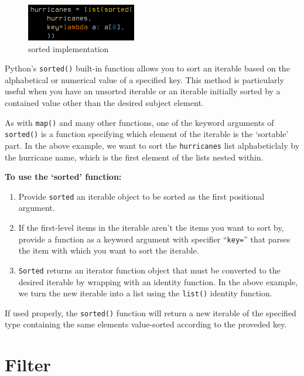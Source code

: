 \documentclass[12pt]{article}
\begin{document}
\begin{figure}
	\begin{center}
		\includegraphics[width=.38\textwidth]{./figures/4_sorted/codeblock_sorted.png}
		\caption{sorted implementation}
		\label{sorted code} %
	\end{center}
\end{figure}

Python's \texttt{sorted()} built-in function allows you to sort an iterable based on the alphabetical or numerical value of a specified key. This method is particularly useful when you have an unsorted iterable or an iterable initially sorted by a contained value other than the desired subject element.

As with \texttt{map()} and many other functions, one of the keyword arguments of \texttt{sorted()} is a function specifying which element of the iterable is the `sortable' part. In the above example, we want to sort the \texttt{hurricanes} list alphabeticlaly by the hurricane name, which is the first element of the lists nested within.

\vspace{1em}
\noindent
\textbf{To use the `sorted' function:}
\begin{enumerate}
	\item{Provide \texttt{sorted} an iterable object to be sorted as the first positional argument.}
	\item{If the first-level items in the iterable aren't the items you want to sort by, provide a function as a keyword argument with specifier ``\texttt{key=}'' that parses the item with which you want to sort the iterable.}
	\item{\texttt{Sorted} returns an iterator function object that must be converted to the desired iterable by wrapping with an identity function. In the above example, we turn the new iterable into a list using the \texttt{list()} identity function.}
\end{enumerate}

\noindent
If used properly, the \texttt{sorted()} function will return a new iterable of the specified type containing the same elements value-sorted according to the proveded key.


\newpage
\section{Filter}
\label{filter}
\end{document}
